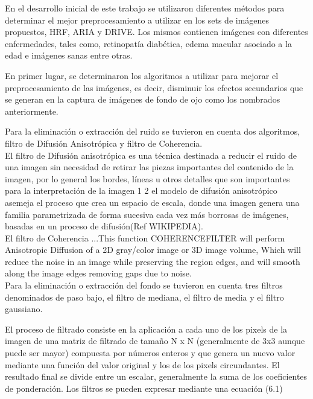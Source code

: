 En el desarrollo inicial de este trabajo se utilizaron diferentes m\'etodos para determinar el mejor preprocesamiento a utilizar en los sets de im\'agenes propuestos, HRF, ARIA y DRIVE. Los mismos contienen im\'agenes con diferentes enfermedades, tales como, retinopat\'ia diab\'etica, edema macular asociado a la edad e im\'agenes sanas entre otras. 

En primer lugar, se determinaron los algoritmos a utilizar para mejorar el preprocesamiento de las im\'agenes, es decir, disminuir los efectos secundarios que se generan en la captura de im\'agenes de fondo de ojo como los nombrados anteriormente. 

Para la eliminaci\'on o extracci\'on del ruido se tuvieron en cuenta dos algoritmos, filtro de Difusi\'on Anisotr\'opica y filtro de  Coherencia.\\

El filtro de Difusi\'on anisotr\'opica es una técnica destinada a reducir el ruido de una imagen sin necesidad de retirar las piezas importantes del contenido de la imagen, por lo general los bordes, líneas u otros detalles que son importantes para la interpretación de la imagen 1 2 el modelo de difusión anisotrópico asemeja el proceso que crea un espacio de escala, donde una imagen genera una familia parametrizada de forma sucesiva cada vez más borrosas de imágenes, basadas en un proceso de difusión(Ref WIKIPEDIA).\\

El filtro de Coherencia ...This function COHERENCEFILTER will perform Anisotropic Diffusion of a 2D gray/color image or 3D image volume, Which will reduce the noise in an image while preserving the region edges, and will smooth along
the image edges removing gaps due to noise.\\

Para la eliminaci\'on o extracci\'on del fondo se tuvieron en cuenta tres filtros denominados de paso bajo, el filtro de mediana, el filtro de media y el filtro gaussiano. 

El proceso de filtrado consiste en la aplicación a cada uno de los pixels de la imagen de una matriz de filtrado de tamaño N x N (generalmente de 3x3 aunque puede ser mayor) compuesta por números enteros y que genera un nuevo valor mediante una función del valor original y los de los pixels circundantes. El resultado final se divide entre un escalar, generalmente la suma de los coeficientes de ponderación. Los filtros se pueden expresar mediante una ecuación (6.1)


